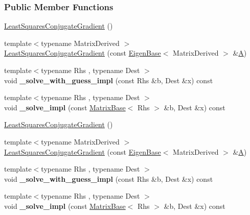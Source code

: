 \subsubsection*{Public Member Functions}
\begin{DoxyCompactItemize}
\item 
\hyperlink{group___iterative_linear_solvers___module_ace69f423fcc1f8960d0e2de0667447c9}{Least\+Squares\+Conjugate\+Gradient} ()
\item 
{\footnotesize template$<$typename Matrix\+Derived $>$ }\\\hyperlink{group___iterative_linear_solvers___module_a91c4f2edc20f93cee9b721165937fb99}{Least\+Squares\+Conjugate\+Gradient} (const \hyperlink{group___core___module_struct_eigen_1_1_eigen_base}{Eigen\+Base}$<$ Matrix\+Derived $>$ \&\hyperlink{group___core___module_class_eigen_1_1_matrix}{A})
\item 
\mbox{\label{group___iterative_linear_solvers___module_a04c0c32b322d74949d190731a354340e}} 
{\footnotesize template$<$typename Rhs , typename Dest $>$ }\\void {\bfseries \+\_\+solve\+\_\+with\+\_\+guess\+\_\+impl} (const Rhs \&b, Dest \&x) const
\item 
\mbox{\label{group___iterative_linear_solvers___module_aaadb8f72ca585e7dd5f41ddf7e14a9d3}} 
{\footnotesize template$<$typename Rhs , typename Dest $>$ }\\void {\bfseries \+\_\+solve\+\_\+impl} (const \hyperlink{group___core___module_class_eigen_1_1_matrix_base}{Matrix\+Base}$<$ Rhs $>$ \&b, Dest \&x) const
\item 
\hyperlink{group___iterative_linear_solvers___module_ace69f423fcc1f8960d0e2de0667447c9}{Least\+Squares\+Conjugate\+Gradient} ()
\item 
{\footnotesize template$<$typename Matrix\+Derived $>$ }\\\hyperlink{group___iterative_linear_solvers___module_a91c4f2edc20f93cee9b721165937fb99}{Least\+Squares\+Conjugate\+Gradient} (const \hyperlink{group___core___module_struct_eigen_1_1_eigen_base}{Eigen\+Base}$<$ Matrix\+Derived $>$ \&\hyperlink{group___core___module_class_eigen_1_1_matrix}{A})
\item 
\mbox{\label{group___iterative_linear_solvers___module_a04c0c32b322d74949d190731a354340e}} 
{\footnotesize template$<$typename Rhs , typename Dest $>$ }\\void {\bfseries \+\_\+solve\+\_\+with\+\_\+guess\+\_\+impl} (const Rhs \&b, Dest \&x) const
\item 
\mbox{\label{group___iterative_linear_solvers___module_aaadb8f72ca585e7dd5f41ddf7e14a9d3}} 
{\footnotesize template$<$typename Rhs , typename Dest $>$ }\\void {\bfseries \+\_\+solve\+\_\+impl} (const \hyperlink{group___core___module_class_eigen_1_1_matrix_base}{Matrix\+Base}$<$ Rhs $>$ \&b, Dest \&x) const
\end{DoxyCompactItemize}
